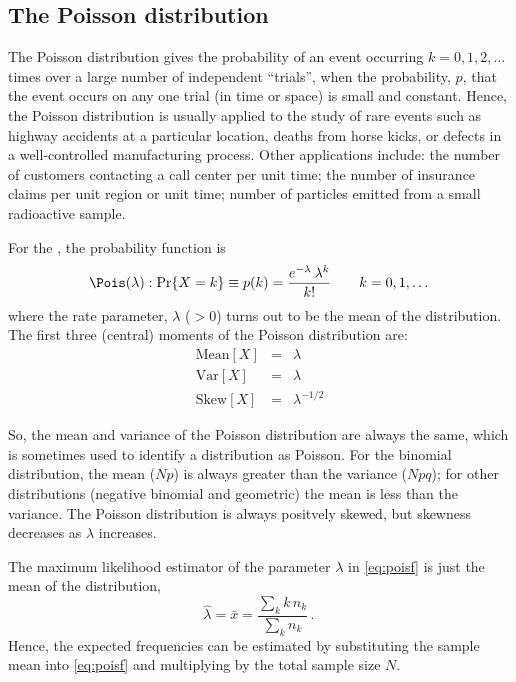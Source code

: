 \documentclass[11pt]{book}\usepackage[]{graphicx}\usepackage[]{color}
\begin{document}

\subsection{The Poisson distribution}\label{sec:poisson}

The Poisson distribution gives the probability of an event occurring
$k = 0, 1, 2, \dots$ times over a large number of independent ``trials'',
when the probability, $p$, that the event occurs on any one
trial (in time or space) is small and constant.
Hence, the Poisson distribution is usually applied to the study of
rare events such as highway accidents at a particular location,
deaths from horse kicks, or defects in a well-controlled manufacturing
process.  Other applications include:
the number of customers contacting a call center per unit time;
the number of insurance claims per unit region or unit time;
number of particles emitted from a small radioactive sample.

For the , the probability function
is
\begin{equation}\label{eq:poisf}
\Pois(\lambda):\Pr \{ X = k \} \equiv p (k)=
  \frac{ e^{ - \lambda } \:  \lambda^k } { k ! }
  \quad\quad k = 0, 1, \dots
\end{equation}
where the rate parameter, $\lambda$ ($>0$) turns out to be the mean of the
distribution.
The first three (central) moments of the Poisson distribution are:
\begin{eqnarray*}
\textrm{Mean}[X] & = & \lambda \\
\textrm{Var}[X] &  = & \lambda \\
\textrm{Skew}[X] & = & \lambda^{- 1/2} 
\end{eqnarray*}

So, the mean and variance of the Poisson distribution are always
the same, which is sometimes used to identify a distribution
as Poisson.  For the binomial distribution, the mean ($Np$) is always
greater than the variance ($Npq$); for other distributions
(negative binomial and geometric) the mean is less than the
variance. The Poisson distribution is always positvely skewed,
but skewness decreases as $\lambda$ increases.

The maximum likelihood estimator of the parameter \(\lambda\)
in \eqref{eq:poisf} is just
the mean of the distribution,
\begin{equation}
  \hat{\lambda}= \bar{x} = \frac{\sum_k k \,  n_k}{\sum_k  n_k} \label{eq:pois-lambda}
  \period
\end{equation}
Hence, the expected frequencies can be estimated by substituting the
sample mean into \eqref{eq:poisf} and multiplying by the total
sample size $N$.
\end{document}
